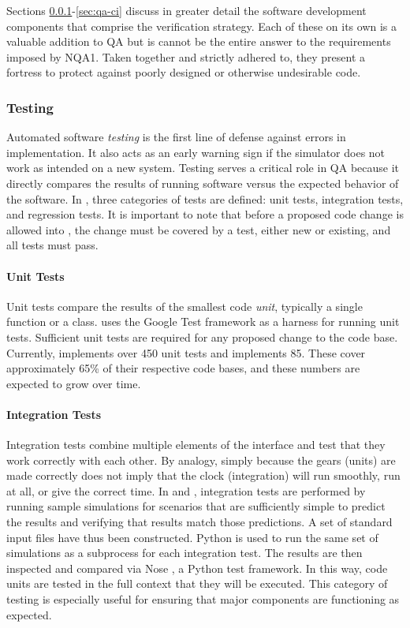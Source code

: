 Sections \ref{sec:qa-testing}-\ref{sec:qa-ci} discuss in greater detail the software
development components that comprise the \Cyclus verification strategy.
Each of these on its own is a valuable addition to \gls{QA} but is cannot be the
entire answer to the requirements imposed by \gls{NQA1}. Taken together and strictly
adhered to, they present a fortress to protect against poorly designed or otherwise undesirable code.


\subsubsection{Testing}
\label{sec:qa-testing}

Automated software \emph{testing} is the first line of defense against
errors in implementation. It also acts as an early warning sign if the
simulator does not work as intended on a new system.
Testing serves a critical role in \gls{QA} because it directly compares the
results of running software versus the expected behavior of the software.
In \Cyclus, three categories of tests are defined: unit tests, integration
tests, and regression tests.  It is important to note that before a proposed
code change is allowed into \Cyclus,  the change must be covered by a test, either new or existing, and all tests must pass.

\paragraph{Unit Tests}

Unit tests compare the results of the smallest code \emph{unit}, typically a
single function or a class.  \Cyclus uses the Google Test framework
\cite{inc_googletest_2008} as a harness for running unit tests. Sufficient unit
tests are required for any proposed change to the \Cyclus code base. Currently,
\Cyclus implements over 450 unit tests and \Cycamore implements 85.  These
cover approximately 65\% of their respective code bases, and these numbers are
expected to grow over time.

\paragraph{Integration Tests}

Integration tests combine multiple elements of the
\Cyclus interface and test that they work correctly with each other.  By analogy,
simply because the gears (units) are made correctly does not imply that the
clock (integration) will run smoothly, run at all, or give the correct time.
In \Cyclus and \Cycamore, integration tests are performed by running sample
simulations for scenarios that are sufficiently simple to predict the results and verifying
        that results match those predictions. A set of standard input files have thus been constructed.
Python is used to run the same set of \Cyclus simulations as a subprocess for each integration test.
 The results are then inspected and compared via Nose \cite{pellerin_nose_2007}, a Python test framework.
In this way, \Cyclus code units are tested in the full context that they will be
executed. This category of testing is especially useful for ensuring that
major \Cyclus components are functioning as expected.

